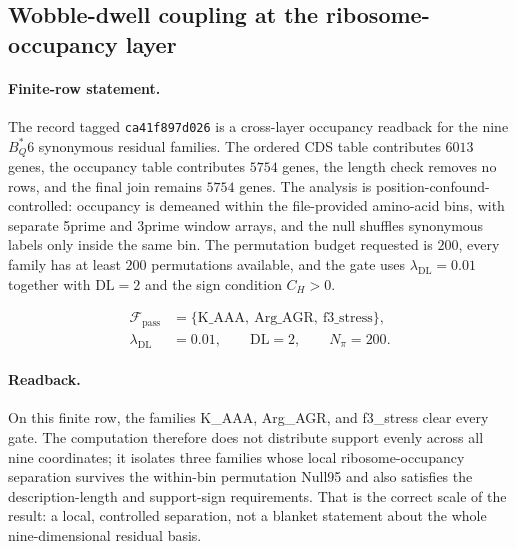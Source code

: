 \subsection{Wobble-dwell coupling at the ribosome-occupancy layer}
\label{subsec:wobble-dwell-coupling-b-star-q6-ribosome-occupancy}

\paragraph{Finite-row statement.}
The record tagged \texttt{ca41f897d026} is a cross-layer occupancy readback for the nine $B^{*}_Q6$ synonymous residual families. The ordered CDS table contributes $6013$ genes, the occupancy table contributes $5754$ genes, the length check removes no rows, and the final join remains $5754$ genes. The analysis is position-confound-controlled: occupancy is demeaned within the file-provided amino-acid bins, with separate 5prime and 3prime window arrays, and the null shuffles synonymous labels only inside the same bin. The permutation budget requested is $200$, every family has at least $200$ permutations available, and the gate uses $\lambda_{\mathrm{DL}}=0.01$ together with $\mathrm{DL}=2$ and the sign condition $C_H>0$.

$$\begin{aligned}
\mathcal{F}_{\mathrm{pass}} &= \{\text{K\_AAA},\ \text{Arg\_AGR},\ \text{f3\_stress}\},\\
\lambda_{\mathrm{DL}} &= 0.01,\qquad \mathrm{DL}=2,\qquad N_{\pi}=200.
\end{aligned}$$

\paragraph{Readback.}
On this finite row, the families K\_AAA, Arg\_AGR, and f3\_stress clear every gate. The computation therefore does not distribute support evenly across all nine coordinates; it isolates three families whose local ribosome-occupancy separation survives the within-bin permutation Null95 and also satisfies the description-length and support-sign requirements. That is the correct scale of the result: a local, controlled separation, not a blanket statement about the whole nine-dimensional residual basis.

